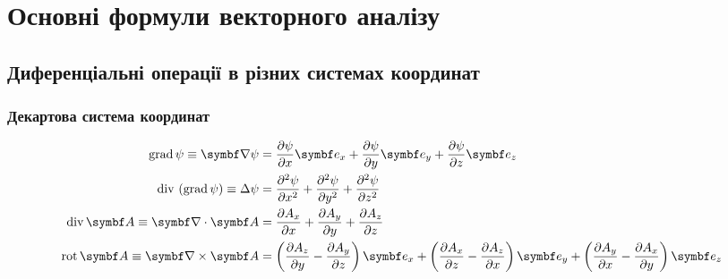 

\clearpage

\section{Основні формули векторного аналізу}\label{Vanaliz}

\subsection{Диференціальні операції в різних системах координат}

\subsubsection{Декартова система координат}

\begin{align}\label{cartesian}
	\mathrm{grad}\,\psi \equiv \vect{\nabla}\psi & = \frac{\partial \psi}{\partial x} \vect{e}_x + \frac{\partial \psi}{\partial y} \vect{e}_y +
	\frac{\partial \psi}{\partial z} \vect{e}_z \\
	\mathrm{div}\,\left(\mathrm{grad}\,\psi\right) \equiv \Laplasian\psi    & = \frac{\partial^2 \psi}{\partial x^2} + \frac{\partial^2 \psi}{\partial y^2} + \frac{\partial^2 \psi }{\partial z^2}               \\
	\mathrm{div}\,\vect{A} \equiv \divg\vect{A}     & = \frac{\partial A_x}{\partial x}  + \frac{\partial A_y}{\partial y} + \frac{\partial A_z}{\partial z}                              \\
	\mathrm{rot}\,\vect{A} \equiv  \rot\vect{A}      & = \left( \frac{\partial A_z}{\partial y}  - \frac{\partial A_y}{\partial z}\right)  \vect{e}_x +
	\left( \frac{\partial A_x}{\partial z}  - \frac{\partial A_z}{\partial x}\right)  \vect{e}_y +
	\left( \frac{\partial A_y}{\partial x}  - \frac{\partial A_x}{\partial y}\right)  \vect{e}_z
\end{align}

